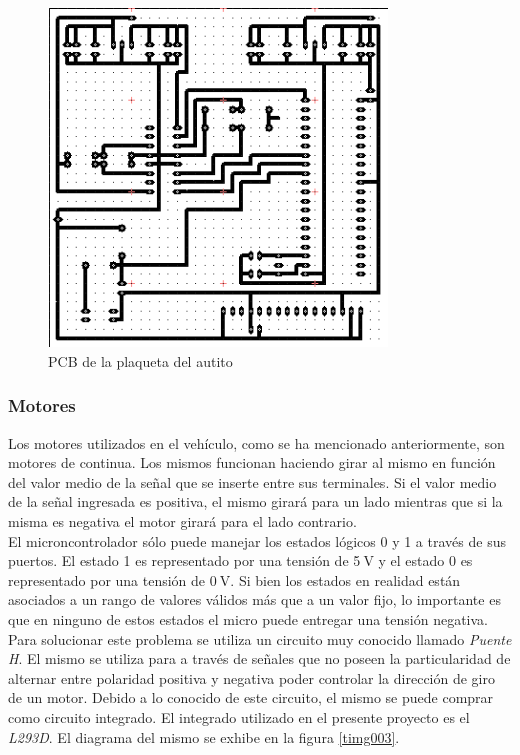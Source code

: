 \documentclass[a4paper,10pt]{article}
\begin{document}
					\begin{figure}[!htb]
						\centering
						\includegraphics[width=9cm]{Imagenes/PCBAutito.png}
						\caption{PCB de la plaqueta del autito} \label{timg002}
					\end{figure}


				\subsubsection{Motores}
					Los motores utilizados en el vehículo, como se ha mencionado anteriormente, son motores de continua. Los mismos funcionan haciendo girar 
					al mismo en función del valor medio de la señal que se inserte entre sus terminales. Si el valor medio de la señal ingresada es positiva, el mismo 
					girará para un lado mientras que si la misma es  negativa el motor girará para el lado contrario. \\
					\indent	El microncontrolador sólo puede manejar los estados lógicos 0 y 1 a través de sus puertos. El estado 1 es representado por una tensión de 
					5$~\text{V}$ y el estado 0 es representado por una tensión de $0~\text{V}$. Si bien los estados en realidad están asociados a un rango de valores 
					válidos más que a un valor fijo, lo importante es que en ninguno de estos estados el micro puede entregar una tensión negativa.
					\indent Para solucionar este problema se utiliza un circuito muy conocido llamado \emph{Puente H}. El mismo se utiliza para a través de 
					señales que no poseen la particularidad de alternar entre polaridad positiva y negativa poder controlar la dirección de giro de un motor. Debido a 
					lo conocido de este circuito, el mismo se puede comprar como circuito integrado. El integrado utilizado en el presente proyecto es el 
					\emph{L293D}. El diagrama del mismo se exhibe en la figura \ref{timg003}.	  
\end{document}
